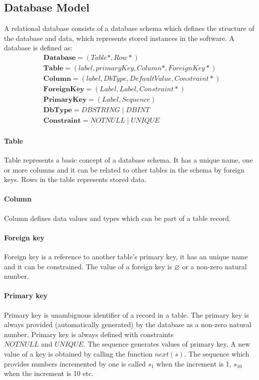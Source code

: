\documentclass[runningheads]{comsis}
\begin{document}
\subsection{Database Model}
A relational database consists of a database schema which defines the structure of the database and data, which represents stored instances in the software. A database is defined as:
\begin{align}
&	\mathbf{Database} = ( Table*, Row* )\\
&	\mathbf{Table} = (label, primaryKey, Column*, ForeignKey*)\\
&	\mathbf{Column} = (label, DbType, DefaultValue, Constraint*) \\
&	\mathbf{ForeignKey} = (Label, Label, Constraint*) \\
&	\mathbf{PrimaryKey} =  ( Label, Sequence ) \\
&	\mathbf{DbType} = DBSTRING \; | \; DBINT\\
&	\mathbf{Constraint} = NOTNULL \; | \; UNIQUE 
\end{align}

\paragraph{Table} Table represents a basic concept of a database schema. It has a unique name, one or more columns and it can be related to other tables in the schema by foreign keys. Rows in the table represents stored data.

\paragraph{Column} Column defines data values and types which can be part of a table record.

\paragraph{Foreign key} Foreign key is a reference to another table's primary key, it has an unique name and it can be constrained. The value of a foreign key is $\varnothing$ or a non-zero natural number.

\paragraph{Primary key} Primary key is unambiguous identifier of a record in a table. The primary key is always provided (automatically generated) by the database as a non-zero natural number. Primary key is always defined with constraints\\ $NOTNULL$ and $UNIQUE$. The sequence generates values of primary key. A new value of a key is obtained by calling the function $next(s)$. The sequence which provides numbers incremented by one is called $s_1$ when the increment is 1, $s_{10}$ when the increment is 10 etc.
\end{document}
